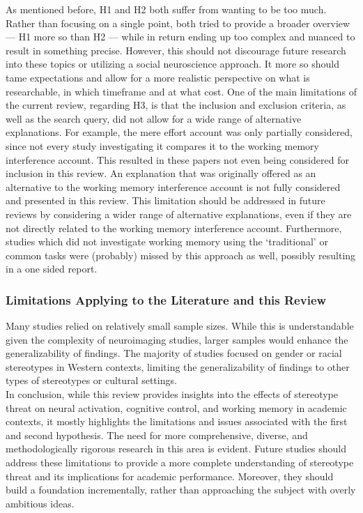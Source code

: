 \documentclass[
  stu, a4paper,floatsintext]{apa7}
\begin{document}
As mentioned before, H1 and H2 both suffer from wanting to be too much.
Rather than focusing on a single point, both tried to provide a broader overview --- H1 more so than H2 --- while in return ending up too complex and nuanced to result in something precise.
However, this should not discourage future research into these topics or utilizing a social neuroscience approach.
It more so should tame expectations and allow for a more realistic perspective on what is researchable, in which timeframe and at what cost.
One of the main limitations of the current review, regarding H3, is that the inclusion and exclusion criteria, as well as the search query, did not allow for a wide range of alternative explanations.
For example, the mere effort account was only partially considered, since not every study investigating it compares it to the working memory interference account.
This resulted in these papers not even being considered for inclusion in this review.
An explanation that was originally offered as an alternative to the working memory interference account is not fully considered and presented in this review.
This limitation should be addressed in future reviews by considering a wider range of alternative explanations, even if they are not directly related to the working memory interference account.
Furthermore, studies which did not investigate working memory using the `traditional' or common tasks were (probably) missed by this approach as well, possibly resulting in a one sided report.

\subsubsection{Limitations Applying to the Literature and this Review}\label{limitations-applying-to-the-literature-and-this-review}

Many studies relied on relatively small sample sizes.
While this is understandable given the complexity of neuroimaging studies, larger samples would enhance the generalizability of findings.
The majority of studies focused on gender or racial stereotypes in Western contexts, limiting the generalizability of findings to other types of stereotypes or cultural settings.\\
In conclusion, while this review provides insights into the effects of stereotype threat on neural activation, cognitive control, and working memory in academic contexts, it mostly highlights the limitations and issues associated with the first and second hypothesis.
The need for more comprehensive, diverse, and methodologically rigorous research in this area is evident.
Future studies should address these limitations to provide a more complete understanding of stereotype threat and its implications for academic performance.
Moreover, they should build a foundation incrementally, rather than approaching the subject with overly ambitious ideas.
\end{document}
